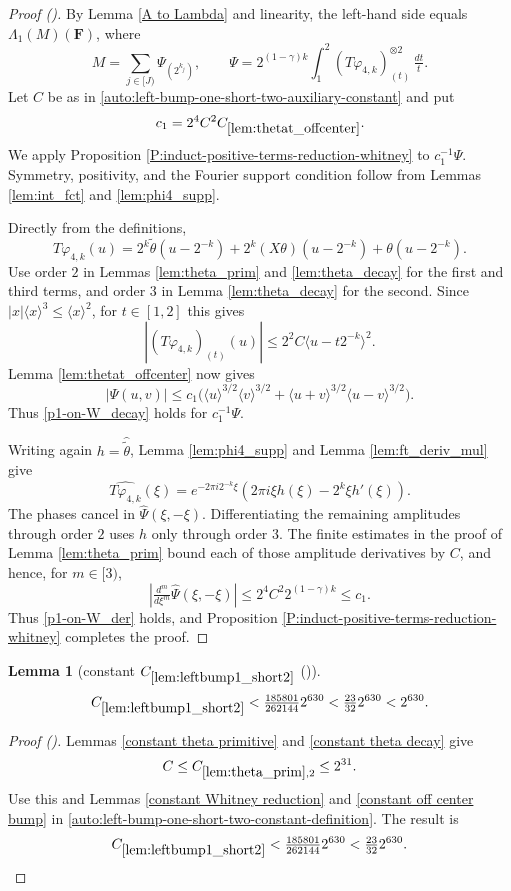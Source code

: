\documentclass[12pt,reqno]{amsart}
\newcommand{\auto}{{({\tiny\faCar})}}
\theoremstyle{plain}
\newtheorem{lemma}[theorem]{Lemma}
\numberwithin{equation}{section}
\theoremstyle{remark}
\newcommand{\uses}[1]{}
\newcommand{\usesdefs}[1]{}
\newcommand{\F}{\mathbf{F}}
\begin{document}
\begin{proof}[Proof \auto]
By Lemma \ref{A to Lambda} and linearity, the left-hand side equals $\Lambda_1(M)(\F)$, where
\[
M=\sum_{j\in[J)}\Psi_{(2^{k_j})},
\qquad
\Psi=2^{(1-\gamma)k}\int_1^2(T\varphi_{4,k})_{(t)}^{\otimes2}\,\tfrac{dt}{t}.
\]
Let $C$ be as in \eqref{auto:left-bump-one-short-two-auxiliary-constant} and put
\[
c_1=2^4C^2C_{\ref{lem:thetat_offcenter}}.
\]
We apply Proposition \ref{P:induct-positive-terms-reduction-whitney} to $c_1^{-1}\Psi$. Symmetry, positivity, and the Fourier support condition follow from Lemmas \ref{lem:int_fct} and \ref{lem:phi4_supp}.

Directly from the definitions,
\[
T\varphi_{4,k}(u)
=2^k\widetilde\theta(u-2^{-k})
+2^k(X\theta)(u-2^{-k})
+\theta(u-2^{-k}).
\]
Use order $2$ in Lemmas \ref{lem:theta_prim} and \ref{lem:theta_decay} for the first and third terms, and order $3$ in Lemma \ref{lem:theta_decay} for the second. Since $|x|\langle x\rangle^3\le\langle x\rangle^2$, for $t\in[1,2]$ this gives
\[
|(T\varphi_{4,k})_{(t)}(u)|
\le2^2C\langle u-t2^{-k}\rangle^2.
\]
Lemma \ref{lem:thetat_offcenter} now gives
\[
|\Psi(u,v)|
\le c_1\bigl(
\langle u\rangle^{3/2}\langle v\rangle^{3/2}
+\langle u+v\rangle^{3/2}\langle u-v\rangle^{3/2}
\bigr).
\]
Thus \eqref{p1-on-W_decay} holds for $c_1^{-1}\Psi$.

Writing again $h=\widehat{\widetilde\theta}$, Lemma \ref{lem:phi4_supp} and Lemma \ref{lem:ft_deriv_mul} give
\[
\widehat{T\varphi_{4,k}}(\xi)
=e^{-2\pi i2^{-k}\xi}
\left(2\pi i\xi h(\xi)-2^k\xi h'(\xi)\right).
\]
The phases cancel in $\widehat\Psi(\xi,-\xi)$. Differentiating the remaining amplitudes through order $2$ uses $h$ only through order $3$. The finite estimates in the proof of Lemma \ref{lem:theta_prim} bound each of those amplitude derivatives by $C$, and hence, for $m\in[3)$,
\[
\left|\tfrac{d^m}{d\xi^m}\widehat\Psi(\xi,-\xi)\right|
\le2^4C^2 2^{(1-\gamma)k}
\le c_1.
\]
Thus \eqref{p1-on-W_der} holds, and Proposition \ref{P:induct-positive-terms-reduction-whitney} completes the proof.
\end{proof}

\begin{lemma}[constant $C_{\ref{lem:leftbump1_short2}}$ \auto]\label{constant left bump one short two}\uses{lem:theta_prim,constant theta primitive,constant theta decay,constant Whitney reduction,constant off center bump,lem:leftbump1_short2}\usesdefs{}
\begin{equation}\label{constant left bump one short two bound}
C_{\ref{lem:leftbump1_short2}}
<\tfrac{185801}{262144}2^{630}<\tfrac{23}{32}2^{630}<2^{630}.
\end{equation}
\end{lemma}
\begin{proof}[Proof \auto]
Lemmas \ref{constant theta primitive} and \ref{constant theta decay} give
\[
C\le C_{\ref{lem:theta_prim},2}\le2^{31}.
\]
Use this and Lemmas \ref{constant Whitney reduction} and \ref{constant off center bump} in \eqref{auto:left-bump-one-short-two-constant-definition}. The result is
\[
C_{\ref{lem:leftbump1_short2}}
<\tfrac{185801}{262144}2^{630}
<\tfrac{23}{32}2^{630}.
\]
\end{proof}
\end{document}
